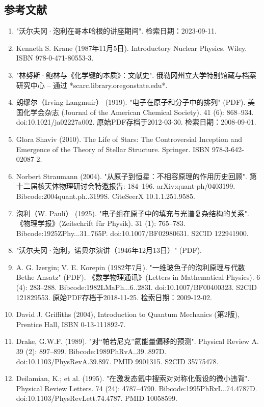 \subsection{参考文献} 
\begin{enumerate}
\item "沃尔夫冈·泡利在哥本哈根的讲座期间". 检索日期：2023-09-11.  
\item Kenneth S. Krane (1987年11月5日). Introductory Nuclear Physics. Wiley. ISBN 978-0-471-80553-3.  
\item "林努斯·鲍林与《化学键的本质》：文献史". 俄勒冈州立大学特别馆藏与档案研究中心 – 通过 *scarc.library.oregonstate.edu*.  
\item 朗缪尔（Irving Langmuir） (1919). "电子在原子和分子中的排列" (PDF). 美国化学会杂志 (Journal of the American Chemical Society). 41 (6): 868–934. doi:10.1021/ja02227a002. 原始PDF存档于2012-03-30. 检索日期：2008-09-01.  
\item Glora Shaviv (2010). The Life of Stars: The Controversial Inception and Emergence of the Theory of Stellar Structure. Springer. ISBN 978-3-642-02087-2.  
\item Norbert Straumann (2004). "从原子到恒星：不相容原理的作用历史回顾". 第十二届核天体物理研讨会特邀报告: 184–196. arXiv:quant-ph/0403199. Bibcode:2004quant.ph..3199S. CiteSeerX 10.1.1.251.9585.  
\item 泡利（W. Pauli） (1925). "电子组在原子中的填充与光谱复杂结构的关系". 《物理学报》(Zeitschrift für Physik). 31 (1): 765–783. Bibcode:1925ZPhy...31..765P. doi:10.1007/BF02980631. S2CID 122941900.  
\item "沃尔夫冈·泡利，诺贝尔演讲（1946年12月13日）" (PDF).  
\item A. G. Izergin; V. E. Korepin (1982年7月). "一维玻色子的泡利原理与代数 Bethe Ansatz" (PDF). 《数学物理通讯》(Letters in Mathematical Physics). 6 (4): 283–288. Bibcode:1982LMaPh...6..283I. doi:10.1007/BF00400323. S2CID 121829553. 原始PDF存档于2018-11-25. 检索日期：2009-12-02.  
\item David J. Griffiths (2004), Introduction to Quantum Mechanics (第2版), Prentice Hall, ISBN 0-13-111892-7.
\item Drake, G.W.F. (1989). "对“帕若尼克”氦能量偏移的预测". Physical Review A. 39 (2): 897–899. Bibcode:1989PhRvA..39..897D. doi:10.1103/PhysRevA.39.897. PMID 9901315. S2CID 35775478.  
\item Deilamian, K.; et al. (1995). "在激发态氦中搜索对对称化假设的微小违背". Physical Review Letters. 74 (24): 4787–4790. Bibcode:1995PhRvL..74.4787D. doi:10.1103/PhysRevLett.74.4787. PMID 10058599.  

\end{enumerate}
